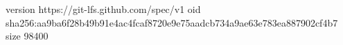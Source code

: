version https://git-lfs.github.com/spec/v1
oid sha256:aa9ba6f28b49b91e4ac4fcaf8720e9e75aadcb734a9ae63e783ea887902cf4b7
size 98400
